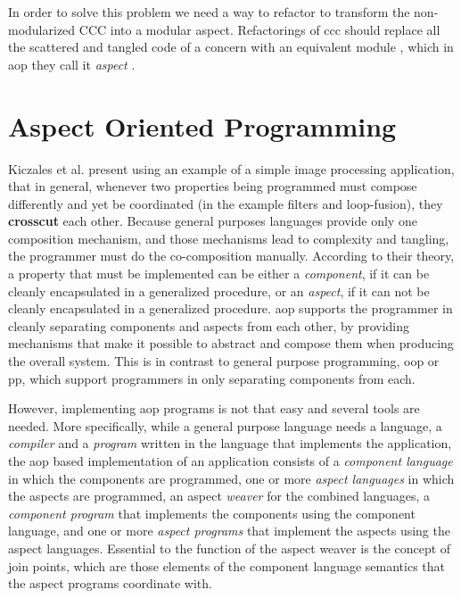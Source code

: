 In order to solve this problem we need a way to refactor to transform the non-modularized CCC into a modular aspect.
Refactorings of \ac{ccc} should replace all the scattered and tangled code of a concern with an equivalent module \cite{hannemann2005role}, which in \ac{aop} they call it \textit{aspect} \cite{kiczales1997aspect}.

\section{Aspect Oriented Programming}\label{Aspect Oriented Programming}

Kiczales et al. present \cite{kiczales1997aspect} using an example of a simple image processing application, that in general, whenever two properties being programmed must compose differently and yet be coordinated (in the example filters and loop-fusion), they \textbf{crosscut} each other. 
Because general purposes languages provide only one composition mechanism, and those mechanisms lead to complexity and tangling, the programmer must do the co-composition manually. 
According to their theory, a property that must be implemented can be either a \textit{component}, if it can be cleanly encapsulated in a generalized procedure, or an \textit{aspect}, if it can not be cleanly encapsulated in a generalized procedure. \ac{aop} supports the programmer in cleanly separating components and aspects from each other, by providing mechanisms that make it possible to abstract and compose them when producing the overall system. 
This is in contrast to general purpose programming, \ac{oop} or \ac{pp}, which support programmers in only separating components from each.

However, implementing \ac{aop} programs is not that easy and several tools are needed. 
More specifically, while a general purpose language needs a language, a \textit{compiler} and a \textit{program} written in the language that implements the application, the \ac{aop} based implementation of an application consists of a \textit{component language} in which the components are programmed, one or more \textit{aspect languages} in which the aspects are programmed, an aspect \textit{weaver} for the combined languages, a \textit{component program} that implements the components using the component language, and one or more \textit{aspect programs} that implement the aspects using the aspect languages. 
Essential to the function of the aspect weaver is the concept of join points, which are those elements of the component language semantics that the aspect programs coordinate with. 

